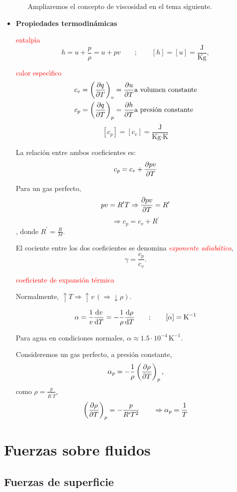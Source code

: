 \begin{itemize}
\begin{itemize}
		Ampliaremos el concepto de viscosidad en el tema siguiente.
		
	\end{itemize}
	\item {\textbf{Propiedades termodin\'amicas}}
	
	\textcolor{red}{entalp\'{\i}a}
	$$ h = u + \frac{p}{\rho} = u + p v \qquad ; \qquad \left[h\right] = \left[u\right] = \frac{\textrm{J}}{\textrm{Kg}},
	$$
	
	\textcolor{red}{calor espec\'{\i}fico}
	\begin{eqnarray*}
		c_v = \left(\frac{\partial q}{\partial T}\right)_v = \frac{\partial u}{\partial T} & \textrm{a volumen constante} \\
		c_p = \left(\frac{\partial q}{\partial T}\right)_p = \frac{\partial h}{\partial T} & \textrm{a presi\'on constante}
	\end{eqnarray*}
	$$
	\left[ c_p \right] = \left[ c_v \right] = \frac{\textrm{J}}{\textrm{Kg}\cdot\textrm{K}}
	$$
	
	La relaci\'on entre ambos coeficientes es:
	$$
	c_p = c_v + \frac{\partial p v}{\partial T}
	$$
	
	Para un gas perfecto,
	$$ pv = R^\prime T  \Rightarrow \frac{\partial pv}{\partial T} = R^\prime $$
	$$ \Rightarrow c_p = c_v + R^\prime $$,
	donde $R^\prime = \frac{R}{M}$.
	
	El cociente entre los dos coeficientes se denomina \textit{\textcolor{red}{exponente adiab\'atico}},
	$$
	\gamma = \frac{c_p}{c_v}.
	$$
	
	\textcolor{red}{coeficiente de expansi\'on t\'ermica}
	
	Normalmente,  $\uparrow T \Rightarrow \uparrow v \, (\Rightarrow \downarrow \rho)$.
	
	$$
	\alpha = \frac{1}{v}\frac{\textrm{d} v}{\textrm{d} T} = - \frac{1}{\rho} \frac{\textrm{d} \rho}{\textrm{d} T} \qquad; \qquad \left[ \alpha \right] = \textrm{K}^{-1}
	$$
	
	Para agua en condiciones normales, $\alpha \approx 1.5\cdot10^{-4} \,\textrm{K}^{-1}$.
	
	Consideremos un gas perfecto, a presi\'on constante,
	$$
	\alpha_p = -\frac{1}{\rho}\left( \frac{\partial \rho}{\partial T}\right)_p,
	$$
	como $\rho = \frac{p}{R^\prime T}$,
	$$\left(\frac{\partial \rho}{\partial T}\right)_p = -\frac{p}{R^\prime T^2} \qquad \Rightarrow \alpha_p = \frac{1}{T}$$	
\end{itemize}

\section{Fuerzas sobre fluidos}
\subsection{Fuerzas de superficie}

